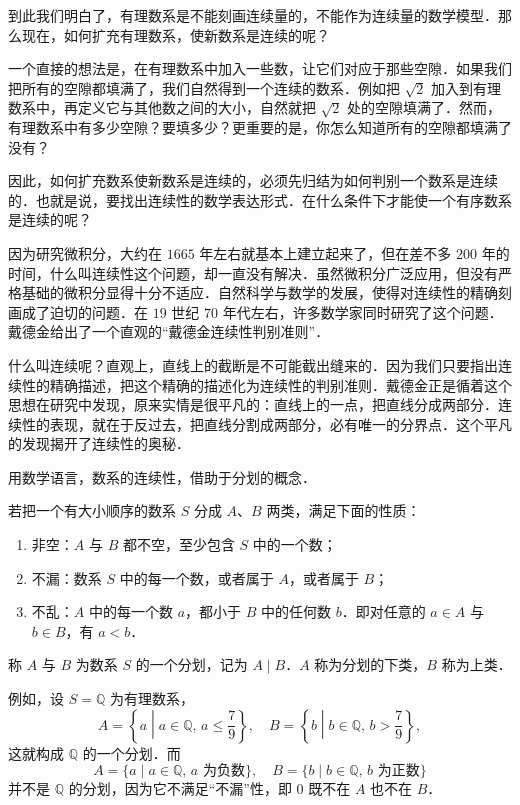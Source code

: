 到此我们明白了，有理数系是不能刻画连续量的，不能作为连续量的数学模型．那么现在，如何扩充有理数系，使新数系是连续的呢？

一个直接的想法是，在有理数系中加入一些数，让它们对应于那些空隙．如果我们把所有的空隙都填满了，我们自然得到一个连续的数系．例如把 $\sqrt{2}$ 加入到有理数系中，再定义它与其他数之间的大小，自然就把 $\sqrt{2}$ 处的空隙填满了．然而，有理数系中有多少空隙？要填多少？更重要的是，你怎么知道所有的空隙都填满了没有？

因此，如何扩充数系使新数系是连续的，必须先归结为如何判别一个数系是连续的．也就是说，要找出连续性的数学表达形式．在什么条件下才能使一个有序数系是连续的呢？

因为研究微积分，大约在 $1665$ 年左右就基本上建立起来了，但在差不多 $200$ 年的时间，什么叫连续性这个问题，却一直没有解决．虽然微积分广泛应用，但没有严格基础的微积分显得十分不适应．自然科学与数学的发展，使得对连续性的精确刻画成了迫切的问题．在 $19$ 世纪 $70$ 年代左右，许多数学家同时研究了这个问题．戴德金给出了一个直观的``戴德金连续性判别准则''．

什么叫连续呢？直观上，直线上的截断是不可能截出缝来的．因为我们只要指出连续性的精确描述，把这个精确的描述化为连续性的判别准则．戴德金正是循着这个思想在研究中发现，原来实情是很平凡的：直线上的一点，把直线分成两部分．连续性的表现，就在于反过去，把直线分割成两部分，必有唯一的分界点．这个平凡的发现揭开了连续性的奥秘．

用数学语言，数系的连续性，借助于分划的概念．

\begin{definition}
若把一个有大小顺序的数系 $S$ 分成 $A$、$B$ 两类，满足下面的性质：
\begin{enumerate}[label=(\roman*)]
  \item 非空：$A$ 与 $B$ 都不空，至少包含 $S$ 中的一个数；
  \item 不漏：数系 $S$ 中的每一个数，或者属于 $A$，或者属于 $B$；
  \item 不乱：$A$ 中的每一个数 $a$，都小于 $B$ 中的任何数 $b$．即对任意的 $a\in A$ 与 $b\in B$，有 $a<b$．
\end{enumerate}
称 $A$ 与 $B$ 为数系 $S$ 的一个分划，记为 $A\mid B$．$A$ 称为分划的下类，$B$ 称为上类．
\label{def:1.1}
\end{definition}

例如，设 $S=\mathbb{Q}$ 为有理数系，
\[
A=\left\{a\mathrel{}\middle|\mathrel{} a\in\mathbb{Q},\, a\leqslant \frac{7}{9}\right\},\quad
B=\left\{b\mathrel{}\middle|\mathrel{} b\in\mathbb{Q},\, b> \frac{7}{9}\right\},
\]
这就构成 $\mathbb{Q}$ 的一个分划．而
\[
A=\{a\mid a\in\mathbb{Q},\, a \text{ 为负数}\},\quad
B=\{b\mid b\in\mathbb{Q},\, b \text{ 为正数}\}
\]
并不是 $\mathbb{Q}$ 的分划，因为它不满足``不漏''性，即 $0$ 既不在 $A$ 也不在 $B$．

